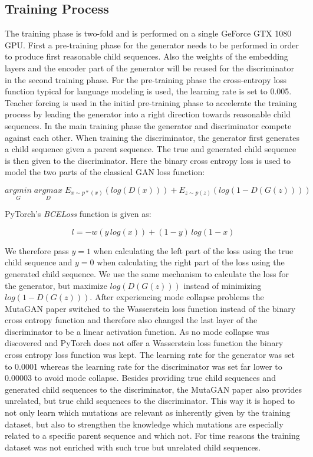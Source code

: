 \subsection{Training Process} \label{ch:approachD}

The training phase is two-fold and is performed on a single GeForce GTX 1080 \ac{GPU}. First a pre-training phase for the generator needs to be performed in order to produce first reasonable child sequences. Also the weights of the embedding layers and the encoder part of the generator will be reused for the discriminator in the second training phase. For the pre-training phase the cross-entropy loss function typical for language modeling is used, the learning rate is set to 0.005. Teacher forcing is used in the initial pre-training phase to accelerate the training process by leading the generator into a right direction towards reasonable child sequences. In the main training phase the generator and discriminator compete against each other. When training the discriminator, the generator first generates a child sequence given a parent sequence. The true and generated child sequence is then given to the discriminator. Here the binary cross entropy loss is used to model the two parts of the classical \ac{GAN} loss function: 

\begin{equation}
	\underset{G}{arg min} \; \underset{D}{arg max} \; E_{x \sim p*(x)}(log(D(x))) + E_{z \sim p(z)}(log(1-D(G(z))))
\end{equation}

PyTorch's \textit{BCELoss} function is given as:

\begin{equation}
	l = -w(y\,log(x)) + (1-y)\,log(1-x)
\end{equation}

We therefore pass $y=1$ when calculating the left part of the loss using the true child sequence and $y=0$ when calculating the right part of the loss using the generated child sequence. We use the same mechanism to calculate the loss for the generator, but maximize $log(D(G(z)))$ instead of minimizing $log(1-D(G(z)))$. After experiencing mode collapse problems the MutaGAN paper \cite{Berman2020} switched to the Wasserstein loss function instead of the binary cross entropy function and therefore also changed the last layer of the discriminator to be a linear activation function. As no mode collapse was discovered and PyTorch does not offer a Wasserstein loss function the binary cross entropy loss function was kept. The learning rate for the generator was set to 0.0001 whereas the learning rate for the discriminator was set far lower to 0.00003 to avoid mode collapse. Besides providing true child sequences and generated child sequences to the discriminator, the MutaGAN paper \cite{Berman2020} also provides unrelated, but true child sequences to the discriminator. This way it is hoped to not only learn which mutations are relevant as inherently given by the training dataset, but also to strengthen the knowledge which mutations are especially related to a specific parent sequence and which not. For time reasons the training dataset was not enriched with such true but unrelated child sequences. 

